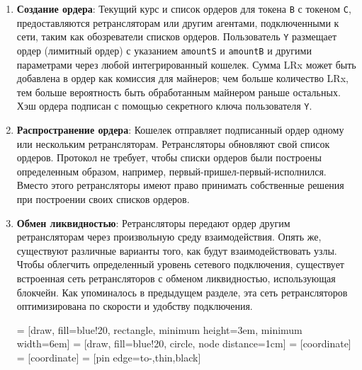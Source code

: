 \documentclass[utf8,nofonts]{article}
\makeatletter
\newenvironment{figurehere}
 {\def\@captype{figure}}
 {}
\makeatother
\begin{document}
\begin{multicols}{2}
\begin{enumerate}
		\item \textbf{Создание ордера}: Текущий курс и список ордеров для токена \verb|B| с токеном \verb|C|, предоставляются ретрансляторам или другим агентами, подключенными к сети, таким как обозреватели списков ордеров. Пользователь \verb|Y| размещает ордер (лимитный ордер) с указанием \verb|amountS| и \verb|amountB| и другими параметрами через любой интегрированный кошелек. Сумма LRx может быть добавлена в ордер как комиссия для майнеров; чем больше количество LRx, тем больше вероятность быть обработанным майнером раньше остальных. Хэш ордера подписан с помощью секретного ключа пользователя \verb|Y|.
		
		\item \textbf{Распространение ордера}: Кошелек отправляет подписанный ордер одному или нескольким ретрансляторам. Ретрансляторы обновляют свой список ордеров. Протокол не требует, чтобы списки ордеров были построены определенным образом, например, первый-пришел-первый-исполнился. Вместо этого ретрансляторы имеют право принимать собственные решения при построении своих списков ордеров.
		
		\item \textbf{Обмен ликвидностью}: Ретрансляторы передают ордер другим ретрансляторам через произвольную среду взаимодействия. Опять же, существуют различные варианты того, как будут взаимодействовать узлы. Чтобы облегчить определенный уровень сетевого подключения, существует встроенная сеть ретрансляторов с обменом ликвидностью, использующая блокчейн. Как упоминалось в предыдущем разделе, эта сеть ретрансляторов оптимизирована по скорости и удобству подключения.
		
		\begin{center}
			\begin{figurehere}
				\centering
				 = [draw, fill=blue!20, rectangle, 
				minimum height=3em, minimum width=6em]
				 = [draw, fill=blue!20, circle, node distance=1cm]
				 = [coordinate]
				 = [coordinate]
				 = [pin edge={to-,thin,black}]
				
				\begin{tikzpicture}[
				auto, 
				scale=0.7,
				node distance=2cm,
				>=latex',
				font=\bfseries\footnotesize\sffamily,
				order/.style={
					rectangle,
					scale=0.7,
					rounded corners,
					draw=black, 
					text centered,
					minimum height=12mm,
					minimum width=30mm,
					fill=white
				},
				role/.style={
					circle,
					scale=0.7,
					draw=black, 
					text centered,
					minimum height=12mm,
					minimum width=12mm,
					fill=white
				},
				steps/.style={
					circle,
					scale=0.7,
					draw=black, 
					text centered,
					fill=black,
					text=white
				},
				account/.style={
					circle,
					scale=0.7,
					draw=black, 
					text centered,
					minimum height=16mm,
					minimum width=16mm,
					fill=white
				},
				label/.style={
					scale=0.7
				}
				]
				

\end{tikzpicture}
\end{figurehere}
\end{center}
\end{enumerate}
\end{multicols}
\end{document}
